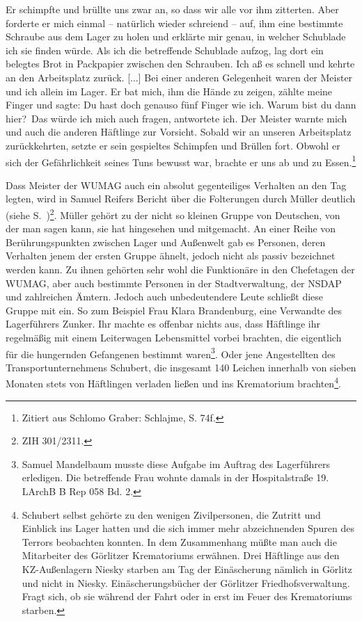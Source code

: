 \documentclass[a4paper,12pt,ngerman,
]{nisebook}
\begin{document}
\begin{leftbar}
Er schimpfte und brüllte uns zwar an, so dass wir alle vor ihm zitterten. Aber forderte er mich einmal -- natürlich wieder schreiend -- auf, ihm eine bestimmte Schraube aus dem Lager zu holen und erklärte mir genau, in welcher Schublade ich sie finden würde. Als ich die betreffende Schublade aufzog, lag dort ein belegtes Brot in Packpapier zwischen den Schrauben. Ich aß es schnell und kehrte an den Arbeitsplatz zurück. [...] Bei einer anderen Gelegenheit waren der Meister und ich allein im Lager. Er bat mich, ihm die Hände zu zeigen, zählte meine Finger und sagte: \glqq Du hast doch genauso fünf Finger wie ich. Warum bist du dann hier?\grqq~Das würde ich mich auch fragen, antwortete ich. Der Meister warnte mich und auch die anderen Häftlinge zur Vorsicht. Sobald wir an unseren Arbeitsplatz zurückkehrten, setzte er sein gespieltes Schimpfen und Brüllen fort. Obwohl er sich der Gefährlichkeit seines Tuns bewusst war, brachte er uns ab und zu Essen.\footnote{Zitiert aus Schlomo Graber: Schlajme, S. 74f.}
\end{leftbar}
Dass Meister der WUMAG auch ein absolut gegenteiliges Verhalten an den Tag legten, wird in Samuel Reifers Bericht über die Folterungen durch Müller deutlich (siehe S.~\pageref{muller})\footnote{ZIH 301/2311.}.
Müller gehört zu der nicht so kleinen Gruppe von Deutschen, von der man sagen kann, sie hat \glqq hingesehen und mitgemacht\grqq. An einer Reihe von  Berührungspunkten zwischen Lager und Außenwelt gab es Personen, deren Verhalten jenem der ersten Gruppe ähnelt, jedoch nicht als passiv bezeichnet werden kann. Zu ihnen gehörten sehr wohl die Funktionäre in den Chefetagen der WUMAG, aber auch bestimmte Personen in der Stadtverwaltung, der NSDAP und zahlreichen Ämtern. Jedoch auch unbedeutendere Leute schließt diese Gruppe mit ein. So zum Beispiel Frau Klara Brandenburg, eine Verwandte des Lagerführers Zunker. Ihr machte es offenbar nichts aus, dass Häftlinge ihr regelmäßig mit einem Leiterwagen Lebensmittel vorbei brachten, die eigentlich für die hungernden Gefangenen bestimmt waren\footnote{Samuel Mandelbaum musste diese Aufgabe im Auftrag des Lagerführers erledigen. Die betreffende Frau wohnte damals in der Hospitalstraße 19. LArchB B Rep 058 Bd. 2.}. Oder jene Angestellten des Transportunternehmens Schubert, die insgesamt 140 Leichen innerhalb von sieben Monaten stets von Häftlingen verladen ließen und ins Krematorium brachten\footnote{Schubert selbst gehörte zu den wenigen Zivilpersonen, die Zutritt und Einblick ins Lager hatten und die sich immer mehr abzeichnenden Spuren des Terrors beobachten konnten. In dem Zusammenhang müßte man auch die Mitarbeiter des Görlitzer Krematoriums erwähnen. Drei Häftlinge aus den KZ-Außenlagern Niesky starben am Tag der Einäscherung nämlich in Görlitz und nicht in Niesky. Einäscherungsbücher der Görlitzer Friedhofsverwaltung. Fragt sich, ob sie während der Fahrt oder in erst im Feuer des Krematoriums starben.}.
\end{document}
